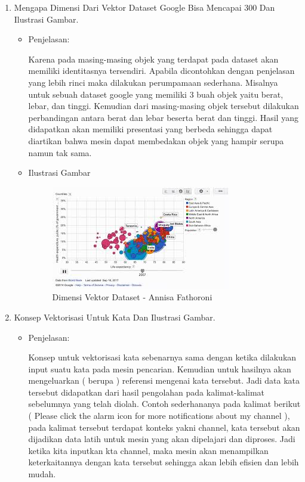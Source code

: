 \begin{enumerate}
\begin{itemize}
\end{itemize}

\item Mengapa Dimensi Dari Vektor Dataset Google Bisa Mencapai 300 Dan Ilustrasi Gambar.
\begin{itemize}
\item Penjelasan:

Karena pada masing-masing objek yang terdapat pada dataset akan memiliki identitasnya tersendiri. Apabila dicontohkan dengan penjelasan yang lebih rinci maka dilakukan perumpamaan sederhana. Misalnya untuk sebuah dataset google yang memiliki 3 buah objek yaitu berat, lebar, dan tinggi.  Kemudian dari masing-masing objek tersebut dilakukan perbandingan antara berat dan lebar beserta berat dan tinggi. Hasil yang didapatkan akan memiliki presentasi yang berbeda sehingga dapat diartikan bahwa mesin dapat membedakan objek yang hampir serupa namun tak sama.

\item Ilustrasi Gambar

\begin{figure}[!hbtp]
\centering
\includegraphics[scale=0.8]{figures/Chapter5AnnisaFathoroni7.jpg}
\caption{Dimensi Vektor Dataset - Annisa Fathoroni}
\label{Dimensi Vektor Dataset - Annisa Fathoroni}
\end{figure}

\end{itemize}

\item Konsep Vektorisasi Untuk Kata Dan Ilustrasi Gambar.
\begin{itemize}
\item  Penjelasan:

Konsep untuk vektorisasi kata sebenarnya sama dengan ketika dilakukan input suatu kata pada mesin pencarian. Kemudian untuk hasilnya akan mengeluarkan ( berupa ) referensi mengenai kata tersebut. Jadi data kata tersebut didapatkan dari hasil pengolahan pada kalimat-kalimat sebelumnya yang telah diolah. Contoh sederhananya pada kalimat berikut ( Please click the alarm icon for more notifications about my channel ), pada kalimat tersebut terdapat konteks yakni channel, kata tersebut akan dijadikan data latih untuk mesin yang akan dipelajari dan diproses. Jadi ketika kita inputkan kta channel, maka mesin akan menampilkan keterkaitannya dengan kata tersebut sehingga akan lebih efisien dan lebih mudah.


\end{itemize}
\end{enumerate}
